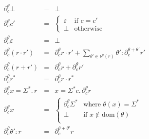 \documentclass[11pt]{amsart}
\begin{document}
$$
\begin{array}{rcl}
\partial_c^\theta \bot &=& \bot \\
\partial_c^\theta c' &=&
	\begin{cases}
	\varepsilon & \textrm{if } c = c' \\
	\bot & \textrm{otherwise}
	\end{cases} \\
\partial_c^\theta \varepsilon &=& \bot \\
\partial_c^\theta (r\cdot r') &=&
	\partial_c^\theta r\cdot r' +
	\sum_{\theta' \in \nu^\theta(r)} \theta'{: \partial_c^{\theta+\theta'} r'} \\
\partial_c^\theta (r + r') &=& \partial_c^\theta r + \partial_c^\theta r' \\
\partial_c^\theta r^* &=& \partial_c^\theta r\cdot r^* \\
\partial_c^\theta x{=}\Sigma^*.\,r &=& x{=}\Sigma^*c.\,\partial_c^\theta r \\
\partial_c^\theta x &=&
	\begin{cases}
	\partial_c^\theta \Sigma^* & \textrm{where }\theta(x)=\Sigma^* \\
	\bot & \textrm{if } x \notin \mathrm{dom}(\theta) \\
	\end{cases} \\
\partial_c^\theta \theta'{: r} &=& \partial_c^{\theta + \theta'}r \\
\end{array}
$$
\end{document}
